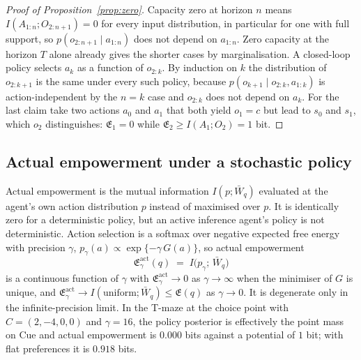\documentclass[pdflatex,sn-apa]{sn-jnl}%
\theoremstyle{definition}
\providecommand{\Emp}{\mathfrak{E}}
\begin{document}
\begin{appendices}
\begin{proof}[Proof of Proposition~\ref{prop:zero}]
Capacity zero at horizon $n$ means $I(A_{1:n}; O_{2:n+1}) = 0$ for every input distribution, in particular for one with full support, so $p(o_{2:n+1} \mid a_{1:n})$ does not depend on $a_{1:n}$. Zero capacity at the horizon $T$ alone already gives the shorter cases by marginalisation. A closed-loop policy selects $a_k$ as a function of $o_{2:k}$. By induction on $k$ the distribution of $o_{2:k+1}$ is the same under every such policy, because $p(o_{k+1} \mid o_{2:k}, a_{1:k})$ is action-independent by the $n = k$ case and $o_{2:k}$ does not depend on $a_k$. For the last claim take two actions $a_0$ and $a_1$ that both yield $o_1 = c$ but lead to $s_0$ and $s_1$, which $o_2$ distinguishes: $\Emp_1 = 0$ while $\Emp_2 \ge I(A_1; O_2) = 1$ bit.
\end{proof}

\subsection*{Actual empowerment under a stochastic policy}
Actual empowerment is the mutual information $I(p; \bar W_q)$ evaluated at the agent's own action distribution $p$ instead of maximised over $p$. It is identically zero for a deterministic policy, but an active inference agent's policy is not deterministic. Action selection is a softmax over negative expected free energy with precision $\gamma$, $p_\gamma(a) \propto \exp\{-\gamma\, G(a)\}$, so actual empowerment
\begin{equation}
  \Emp^{\mathrm{act}}_\gamma(q) \;=\; I\big(p_\gamma;\, \bar W_q\big)
\end{equation}
is a continuous function of $\gamma$ with $\Emp^{\mathrm{act}}_\gamma \to 0$ as $\gamma \to \infty$ when the minimiser of $G$ is unique, and $\Emp^{\mathrm{act}}_\gamma \to I(\text{uniform}; \bar W_q) \le \Emp(q)$ as $\gamma \to 0$. It is degenerate only in the infinite-precision limit. In the T-maze at the choice point with $C = (2, -4, 0, 0)$ and $\gamma = 16$, the policy posterior is effectively the point mass on Cue and actual empowerment is $0.000$ bits against a potential of $1$ bit; with flat preferences it is $0.918$ bits.

\end{appendices}
\end{document}

